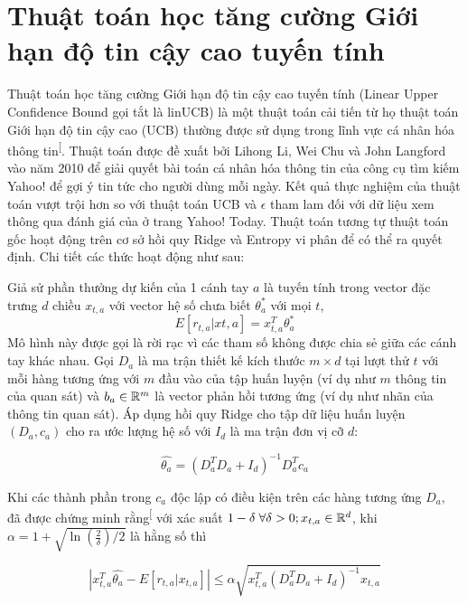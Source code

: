 \documentclass[14pt,oneside]{scrbook}
\begin{document}
\section{Thuật toán học tăng cường Giới hạn độ tin cậy cao tuyến
tính}\label{sec:2.3}

Thuật toán học tăng cường Giới hạn độ tin cậy cao tuyến tính (Linear
Upper Confidence Bound gọi tắt là linUCB) là một thuật toán cải tiến từ
họ thuật toán Giới hạn độ tin cậy cao (UCB) thường được sử dụng trong
lĩnh vực cá nhân hóa thông
tin\textsuperscript{{[}\citeproc{ref-linucb-base}{11}{]}}. Thuật toán
được đề xuất bởi Lihong Li, Wei Chu và John Langford vào năm 2010 để
giải quyết bài toán cá nhân hóa thông tin của công cụ tìm kiếm Yahoo! để
gợi ý tin tức cho người dùng mỗi ngày. Kết quả thực nghiệm của thuật
toán vượt trội hơn so với thuật toán UCB và \(\epsilon\) tham lam đối
với dữ liệu xem thông qua đánh giá của ở trang Yahoo! Today. Thuật toán
tương tự thuật toán gốc hoạt động trên cơ sở hồi quy Ridge và Entropy vi
phân để có thể ra quyết định. Chi tiết các thức hoạt động như sau:

Giả sử phần thưởng dự kiến của 1 cánh tay \(a\) là tuyến tính trong
vector đặc trưng \(d\) chiều \(x_{t,a}\) với vector hệ số chưa biết
\(\theta^{*}_a\) với mọi \(t\),
\begin{equation}E\left[r_{t,a}|x{t,a}\right]=x^{T}_{t,a}\theta^{*}_a\label{eq:2}\end{equation}
Mô hình này được gọi là rời rạc vì các tham số không được chia sẻ giữa
các cánh tay khác nhau. Gọi \(D_a\) là ma trận thiết kế kích thước
\(m \times d\) tại lượt thử \(t\) với mỗi hàng tương ứng với \(m\) đầu
vào của tập huấn luyện (ví dụ như \(m\) thông tin của quan sát) và
\(b_a \in \mathbb{R}^m\) là vector phản hồi tương ứng (ví dụ như nhãn của thông
tin quan sát). Áp dụng hồi quy Ridge cho tập dữ liệu huấn luyện
\(\left(D_a,c_a\right)\) cho ra ước lượng hệ số với \(I_d\) là ma trận
đơn vị cỡ \(d\):

\begin{equation}\hat{\theta_a}=\left(D^T_aD_a+I_d\right)^{-1}D^T_ac_a\label{eq:3}\end{equation}

Khi các thành phần trong \(c_a\) độc lập có điều kiện trên các hàng
tương ứng \(D_a\), đã được chứng minh
rằng\textsuperscript{{[}\citeproc{ref-linucb-base}{11}{]}} với xác suất
\(1-\delta \; \forall \delta > 0; x_{t,a} \in \mathbb{R}^d\), khi
\(\alpha=1+\sqrt{\ln(\frac{2}{\delta})/2}\) là hằng số thì

\begin{equation}\left|x^T_{t,a}\hat{\theta_a}-E\left[r_{t,a}|x_{t,a}\right]\right|\leq\alpha\sqrt{x^T_{t,a}\left(D^T_aD_a+I_d\right)^{-1}x_{t,a}}\label{eq:4}\end{equation}
\end{document}
